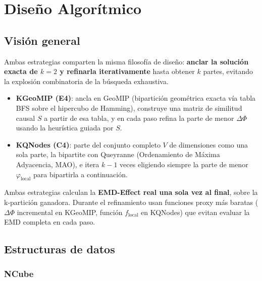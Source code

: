 
\section{Diseño Algorítmico}

\subsection{Visión general}

Ambas estrategias comparten la misma filosofía de diseño: \textbf{anclar la solución exacta
de $k=2$ y refinarla iterativamente} hasta obtener $k$ partes, evitando la explosión
combinatoria de la búsqueda exhaustiva.

\begin{itemize}
  \item \textbf{KGeoMIP (E4)}: ancla en GeoMIP (bipartición geométrica exacta vía tabla BFS
        sobre el hipercubo de Hamming), construye una matriz de similitud causal $S$ a partir
        de esa tabla, y en cada paso refina la parte de menor $\Delta\Phi$ usando la heurística
        guiada por $S$.

  \item \textbf{KQNodes (C4)}: parte del conjunto completo $V$ de dimensiones como una sola
        parte, la bipartite con Queyranne (Ordenamiento de Máxima Adyacencia, MAO), e itera
        $k-1$ veces eligiendo siempre la parte de menor $\varphi_{\text{local}}$ para
        bipartirla a continuación.
\end{itemize}

Ambas estrategias calculan la \textbf{EMD-Effect real una sola vez al final}, sobre la
k-partición ganadora. Durante el refinamiento usan funciones proxy más baratas
($\Delta\Phi$ incremental en KGeoMIP, función $f_{\text{local}}$ en KQNodes) que evitan
evaluar la EMD completa en cada paso.

\subsection{Estructuras de datos}

\subsubsection*{NCube}

